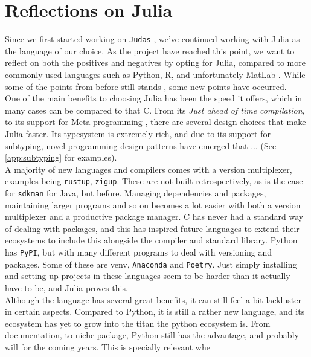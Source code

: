 \section*{Reflections on Julia}
\label{sec:juliaref}

Since we first started working on \texttt{Judas} \cite{projthesis}, we've continued working with Julia as the language of our choice. As the project have reached this point, we want to reflect on both the positives and negatives by opting for Julia, compared to more commonly used languages such as Python, R, and unfortunately MatLab \cite{matlabpyr}. While some of the points from before still stands \cite{projthesis}, some new points have occurred. \\

One of the main benefits to choosing Julia has been the speed it offers, which in many cases can be compared to that C. From its \textit{Just ahead of time compilation}, to its support for Meta programming \cite{whyjulia} \cite{julia}, there are several design choices that make Julia faster. Its typesystem is extremely rich, and due to its support for subtyping, novel programming design patterns have emerged that ... (See \ref{app:subtyping} for examples). \\ 

A majority of new languages and compilers comes with a version multiplexer, examples being \texttt{rustup}, \texttt{zigup}. These are not built retrospectively, as is the case for \texttt{sdkman} for Java, but before. Managing dependencies and packages, maintaining larger programs and so on becomes a lot easier with both a version multiplexer and a productive package manager. C has never had a standard way of dealing with packages, and this has inspired future languages to extend their ecosystems to include this alongside the compiler and standard library. Python has \texttt{PyPI}, but with many different programs to deal with versioning and packages. Some of these are venv, \texttt{Anaconda} and \texttt{Poetry}. Just simply installing and setting up projects in these languages seem to be harder than it actually have to be, and Julia proves this. \\ 


Although the language has several great benefits, it can still feel a bit lackluster in certain aspects. Compared to Python, it is still a rather new language, and its ecosystem has yet to grow into the titan the python ecosystem is. From documentation, to niche package, Python still has the advantage, and probably will for the coming years. This is specially relevant whe \\


